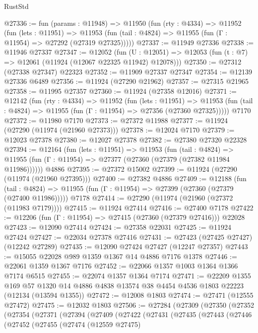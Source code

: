 \begin{lexlean}{RustStd}
\begin{coremodule}
@27336 := fun (params : @11948) =>
  @11950
    (fun (rty : @4334) =>
    @11952
      (fun (lets : @11951) =>
      @11953 (fun (tail : @4824) => @11955 (fun (Γ : @11954) => @27292 (@27319 @27325)))))
@27337 := @11949 @27336
@27338 := @11946 @27337
@27347 := @12052
    (fun (U : @12051) => @12053 (fun (t : @7) => @12061 (@11924 (@12067 @22325 @11942) @12078)))
@27350 := @27312 (@27338 @27347) @22323
@27352 := @11909 @27337 @27347
@27354 := @12139 @27336 @6489
@27356 := @11924 (@27290 @21962)
@27357 := @27315 @21965
@27358 := @11995 @27357
@27360 := @11924 (@27358 @12016)
@27371 := @12142
    (fun (rty : @4334) =>
    @11952
      (fun (lets : @11951) =>
      @11953 (fun (tail : @4824) => @11955 (fun (Γ : @11954) => @27356 (@27360 @27325)))))
    @7170
@27372 := @11980 @7170
@27373 := @27372 @11988
@27377 := @11924 (@27290 (@11974 (@21960 @27373)))
@27378 := @12024 @7170
@27379 := @12023 @27378
@27380 := @12027 @27378
@27382 := @27380 @27320 @22328
@27394 := @12164
    (fun (lets : @11951) =>
    @11953
      (fun (tail : @4824) =>
      @11955 (fun (Γ : @11954) => @27377 (@27360 (@27379 (@27382 @11984 @11986))))))
    @4886
@27395 := @27372 @15002
@27399 := @11924 (@27290 (@11974 (@21960 @27395)))
@27400 := @27382 @4886
@27409 := @12188
    (fun (tail : @4824) => @11955 (fun (Γ : @11954) => @27399 (@27360 (@27379 (@27400 @11986)))))
    @7178
@27414 := @27290 (@11974 (@21960 (@27372 (@11983 @7179))))
@27415 := @11924 @27414
@27416 := @27400 @7178
@27422 := @12206 (fun (Γ : @11954) => @27415 (@27360 (@27379 @27416))) @22028
@27423 := @12090 @27414
@27424 := @27358 @22031
@27425 := @11924 @27424
@27427 := @22034 @27378 @27416
@27431 := @27423 (@27425 @27427) (@12242 @27289)
@27435 := @12090 @27424 @27427 (@12247 @27357)
@27443 := @15055 @22028 @989 @1359 @1367 @14 @4886 @7176 @1378
@27446 := @22061 @1359 @1367 @7176
@27452 := @22066 @1357 @1003 @1364 @1366 @7174 @6515
@27455 := @22074 @1357 @1364 @7174
@27471 := @22209
    @1355
    @169
    @57
    @1320
    @14
    @4886
    @4838
    @13574
    @38
    @4454
    @4536
    @1803
    @22223
    (@12134 (@13594 @1355))
@27472 := @12008 @1803
@27474 := @27471 (@12555 @27472)
@27475 := @12032 @1803
@27506 := @27284
    (@27309
      (@27350
        (@27352
          (@27354
            (@27371
              (@27394
                (@27409
                  (@27422
                    (@27431
                      (@27435
                        (@27443
                          (@27446
                            (@27452
                              (@27455
                                (@27474
                                  (@12559 @27475)

\end{coremodule}
\end{lexlean}
